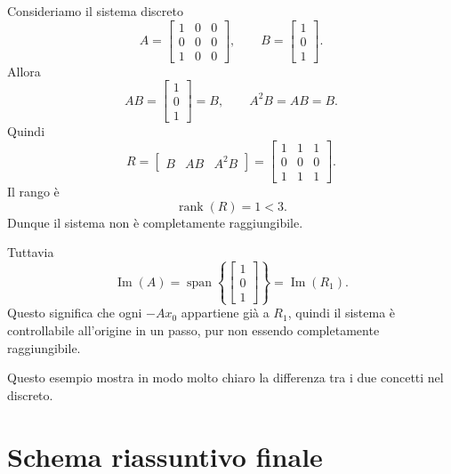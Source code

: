 Consideriamo il sistema discreto
\[
A=
\begin{bmatrix}
1 & 0 & 0\\
0 & 0 & 0\\
1 & 0 & 0
\end{bmatrix},
\qquad
B=
\begin{bmatrix}
1\\
0\\
1
\end{bmatrix}.
\]
Allora
\[
AB=
\begin{bmatrix}
1\\
0\\
1
\end{bmatrix}=B,
\qquad
A^2B=AB=B.
\]
Quindi
\[
R=
\begin{bmatrix}
B & AB & A^2B
\end{bmatrix}
=
\begin{bmatrix}
1 & 1 & 1\\
0 & 0 & 0\\
1 & 1 & 1
\end{bmatrix}.
\]
Il rango è
\[
\operatorname{rank}(R)=1<3.
\]
Dunque il sistema non è completamente raggiungibile.

Tuttavia
\[
\operatorname{Im}(A)=\operatorname{span}\!\left\{\begin{bmatrix}1\\0\\1\end{bmatrix}\right\}
=
\operatorname{Im}(R_1).
\]
Questo significa che ogni \(-Ax_0\) appartiene già a \(R_1\), quindi il sistema è controllabile all’origine in un passo, pur non essendo completamente raggiungibile.

Questo esempio mostra in modo molto chiaro la differenza tra i due concetti nel discreto.

\section{Schema riassuntivo finale}


